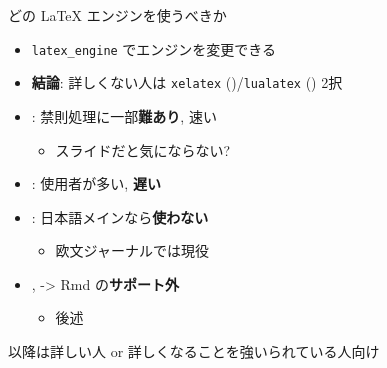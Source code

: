 \documentclass[
  ignorenonframetext,
]{beamer}
\providecommand{\tightlist}{%
  \setlength{\itemsep}{0pt}\setlength{\parskip}{0pt}}
\begin{document}
\begin{frame}[fragile]{どの LaTeX エンジンを使うべきか}
\protect\hypertarget{ux3069ux306e-latex-ux30a8ux30f3ux30b8ux30f3ux3092ux4f7fux3046ux3079ux304dux304b}{}
\begin{itemize}
\item
  \texttt{latex\_engine} でエンジンを変更できる
\item
  \textbf{結論}: 詳しくない人は \texttt{xelatex}
  (\XeLaTeX)/\texttt{lualatex}
  (\LuaLaTeX) 2択
\item
  \XeLaTeX: 禁則処理に一部\textbf{難あり}, 速い

  \begin{itemize}
  \tightlist
  \item
    スライドだと気にならない?
  \end{itemize}
\item
  \LuaLaTeX: 使用者が多い, \textbf{遅い}
\item
  \pdfLaTeX: 日本語メインなら\textbf{使わない}

  \begin{itemize}
  \tightlist
  \item
    欧文ジャーナルでは現役
  \end{itemize}
\item
  \pLaTeX, \upLaTeX -\textgreater{} Rmd
  の\textbf{サポート外}

  \begin{itemize}
  \tightlist
  \item
    後述
  \end{itemize}
\end{itemize}
\end{frame}

\begin{frame}{}
\protect\hypertarget{section-1}{}
以降は詳しい人 or 詳しくなることを強いられている人向け
\end{frame}
\end{document}
